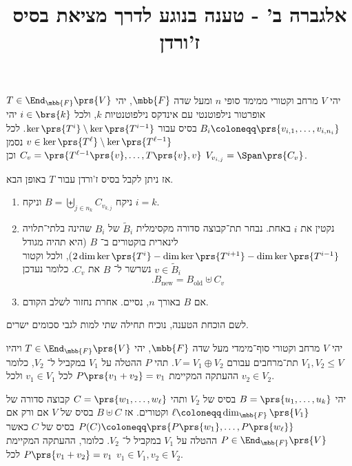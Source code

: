 \documentclass[a4paper,10pt,twoside,openany]{article}
\title{
אלגברה ב' - טענה בנוגע לדרך מציאת בסיס ז'ורדן
}
\date{}
\begin{document}
\maketitle

\begin{propositionstarred}
יהי
$V$
מרחב וקטורי ממימד סופי $n$ ומעל שדה
$\mbb{F}$,
יהי
$T \in \End_{\mbb{F}}\prs{V}$
אופרטור נילפוטנטי עם אינדקס נילפוטנטיות
$k$,
ולכל
$i \in \brs{k}$
יהי
$B_i \coloneqq \prs{v_{i,1}, \ldots, v_{i,n_i}}$
בסיס עבור
$\ker\prs{T^i} \setminus \ker\prs{T^{i-1}}$.
לכל
$v \in \ker\prs{T^\ell} \setminus \ker\prs{T^{\ell - 1}}$
נסמן
$C_v = \prs{T^{\ell-1}\prs{v}, \ldots, T\prs{v}, v}$
וכן
$V_{v_{i,j}} = \Span\prs{C_v}$.

אז ניתן לקבל בסיס ז'ורדן עבור
$T$
באופן הבא.

\begin{enumerate}
\item
ניקח
$B = \biguplus_{j \in n_k} C_{v_{k,j}}$
וניקח
$i = k$.

\item
נקטין את
$i$
באחת.
נבחר תת־קבוצה סדורה מקסימלית
$\tilde{B}_i$
של
$B_i$
שהינה בלתי־תלויה לינארית בוקטורים ב־%
$B$
(היא תהיה מגודל
$2\dim \ker\prs{T^i} - \dim\ker\prs{T^{i+1}} - \dim\ker\prs{T^{i-1}}$),
ולכל וקטור
$v \in \tilde{B}_i$
נשרשר ל־%
$B$
את
$C_v$.
כלומר נעדכן
\[\text{.} B_{\text{new}} = B_{\text{old}} \uplus C_v\]

\item
אם
$B$
באורך
$n$,
נסיים. אחרת נחזור לשלב הקודם.
\end{enumerate}

\end{propositionstarred}

לשם הוכחת הטענה, נוכיח תחילה שתי למות לגבי סכומים ישרים.

\begin{lemma} \label{lemma:basis-projection}
יהי
$V$
מרחב וקטורי סוף־מימדי מעל שדה
$\mbb{F}$,
יהי
$T \in \End_{\mbb{F}}\prs{V}$
ויהיו
$V_1, V_2 \leq V$
תת־מרחבים עבורם
$V = V_1 \oplus V_2$.
תהי
$P$
ההטלה על
$V_1$
במקביל ל־%
$V_2$,
כלומר ההעתקה המקיימת
$P\prs{v_1 + v_2} = v_1$
לכל
$v_1 \in V_1$
ולכל
$v_2 \in V_2$.

יהי
$B = \prs{u_1, \ldots, u_k}$
בסיס של
$V_2$
ותהי
$C = \prs{w_1, \ldots, w_\ell}$
קבוצה סדורה של
$\ell \coloneqq \dim_{\mbb{F}}\prs{V_1}$
וקטורים.
אז
$B \uplus C$
בסיס של
$V$
אם ורק אם
$P(C) \coloneqq \prs{P{\prs{w_1}}, \ldots, P\prs{w_\ell}}$
בסיס של
$C$
כאשר
$P \in \End_{\mbb{F}}\prs{V}$
ההטלה על
$V_1$
במקביל ל־%
$V_2$.
כלומר, ההעתקה המקיימת
$P\prs{v_1 + v_2} = v_1$
לכל
$v_1 \in V_1, v_2 \in V_2$.
\end{lemma}
\end{document}
